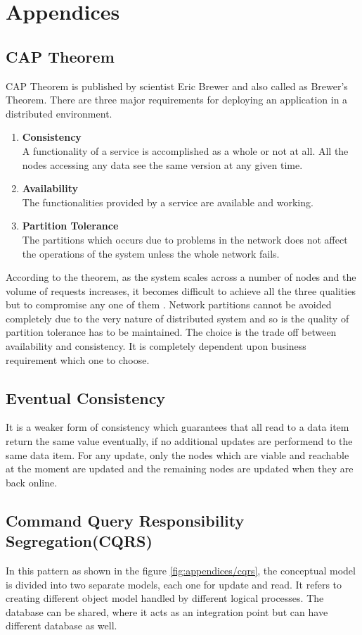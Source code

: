 \chapter{Appendices}\label{chapter:appendices}

\section{CAP Theorem}\label{section:appendices/CAP_theorem}
CAP Theorem is published by scientist Eric Brewer and also called as Brewer's Theorem. There are three major requirements for deploying an application in a distributed environment.
\begin{enumerate}
\item \textbf{Consistency}\\
A functionality of a service is accomplished as a whole or not at all. All the nodes accessing any data see the same version at any given time.
\item \textbf{Availability}\\
The functionalities provided by a service are available and working.
\item \textbf{Partition Tolerance}\\
The partitions which occurs due to problems in the network does not affect the operations of the system unless the whole network fails.
\end{enumerate}
According to the theorem, as the system scales across a number of nodes and the volume of requests increases, it becomes difficult to achieve all the three qualities but to compromise any one of them \cite{Julian:2009aa}. 
Network partitions cannot be avoided completely due to the very nature of distributed system and so is the quality of partition tolerance has to be maintained. The choice is the trade off between availability and consistency. It is completely dependent upon business requirement which one to choose. \cite{Peter-Bailis:2013aa}
\section{Eventual Consistency}\label{section:appendices/eventual_consistency}
It is a weaker form of consistency which guarantees that all read to a data item return the same value eventually, if no additional updates are performend to the same data item. For any update, only the nodes which are viable and reachable at the moment are updated and the remaining nodes are updated when they are back online. \cite{Peter-Bailis:2013aa}
\section{Command Query Responsibility Segregation(CQRS)}\label{section:appendices/CQRS}
In this pattern as shown in the figure \ref{fig:appendices/cqrs}, the conceptual model is divided into two separate models, each one for update and read. It refers to creating different object model handled by different logical processes. The database can be shared, where it acts as an integration point but can have different database as well.

